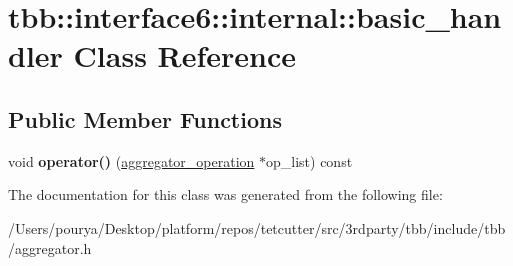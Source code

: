 \hypertarget{classtbb_1_1interface6_1_1internal_1_1basic__handler}{}\section{tbb\+:\+:interface6\+:\+:internal\+:\+:basic\+\_\+handler Class Reference}
\label{classtbb_1_1interface6_1_1internal_1_1basic__handler}
\subsection*{Public Member Functions}
\begin{DoxyCompactItemize}
\item 
\hypertarget{classtbb_1_1interface6_1_1internal_1_1basic__handler_afb0dec67968e9abdabb5a0e3ec8064a4}{}void {\bfseries operator()} (\hyperlink{classtbb_1_1interface6_1_1aggregator__operation}{aggregator\+\_\+operation} $\ast$op\+\_\+list) const \label{classtbb_1_1interface6_1_1internal_1_1basic__handler_afb0dec67968e9abdabb5a0e3ec8064a4}

\end{DoxyCompactItemize}


The documentation for this class was generated from the following file\+:\begin{DoxyCompactItemize}
\item 
/\+Users/pourya/\+Desktop/platform/repos/tetcutter/src/3rdparty/tbb/include/tbb/aggregator.\+h\end{DoxyCompactItemize}
